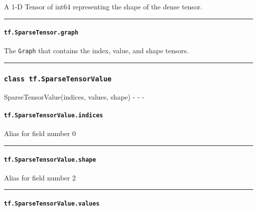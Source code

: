 A 1-D Tensor of int64 representing the shape of the dense tensor.

\begin{center}\rule{0.5\linewidth}{\linethickness}\end{center}

\paragraph{\texorpdfstring{\texttt{tf.SparseTensor.graph}
}{tf.SparseTensor.graph }}\label{tf.sparsetensor.graph}

The \texttt{Graph} that contains the index, value, and shape tensors.

\begin{center}\rule{0.5\linewidth}{\linethickness}\end{center}

\subsubsection{\texorpdfstring{\texttt{class\ tf.SparseTensorValue}
}{class tf.SparseTensorValue }}\label{class-tf.sparsetensorvalue}

SparseTensorValue(indices, values, shape) - - -

\paragraph{\texorpdfstring{\texttt{tf.SparseTensorValue.indices}
}{tf.SparseTensorValue.indices }}\label{tf.sparsetensorvalue.indices}

Alias for field number 0

\begin{center}\rule{0.5\linewidth}{\linethickness}\end{center}

\paragraph{\texorpdfstring{\texttt{tf.SparseTensorValue.shape}
}{tf.SparseTensorValue.shape }}\label{tf.sparsetensorvalue.shape}

Alias for field number 2

\begin{center}\rule{0.5\linewidth}{\linethickness}\end{center}

\paragraph{\texorpdfstring{\texttt{tf.SparseTensorValue.values}
}{tf.SparseTensorValue.values }}\label{tf.sparsetensorvalue.values}

